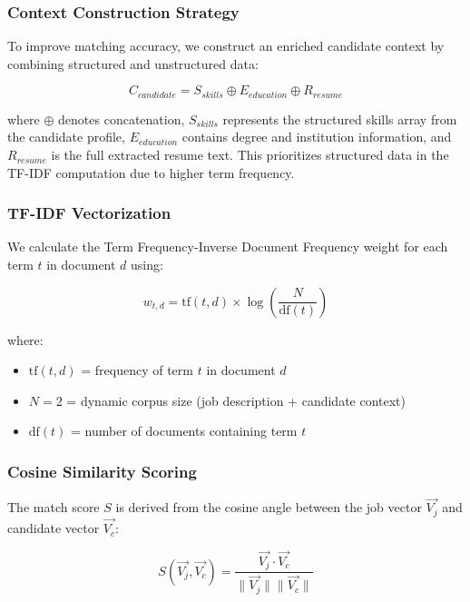 \documentclass[conference]{IEEEtran}
\begin{document}
\subsubsection{Context Construction Strategy}

To improve matching accuracy, we construct an enriched candidate context by combining structured and unstructured data:

\begin{equation}
C_{candidate} = S_{skills} \oplus E_{education} \oplus R_{resume}
\end{equation}

where $\oplus$ denotes concatenation, $S_{skills}$ represents the structured skills array from the candidate profile, $E_{education}$ contains degree and institution information, and $R_{resume}$ is the full extracted resume text. This prioritizes structured data in the TF-IDF computation due to higher term frequency.

\subsubsection{TF-IDF Vectorization}

We calculate the Term Frequency-Inverse Document Frequency weight for each term $t$ in document $d$ using:

\begin{equation}
w_{t,d} = \text{tf}(t, d) \times \log\left(\frac{N}{\text{df}(t)}\right)
\end{equation}

where:
\begin{itemize}
    \item $\text{tf}(t, d)$ = frequency of term $t$ in document $d$
    \item $N = 2$ = dynamic corpus size (job description + candidate context)
    \item $\text{df}(t)$ = number of documents containing term $t$
\end{itemize}

\subsubsection{Cosine Similarity Scoring}

The match score $S$ is derived from the cosine angle between the job vector $\vec{V_j}$ and candidate vector $\vec{V_c}$:

\begin{equation}
S(\vec{V_j}, \vec{V_c}) = \frac{\vec{V_j} \cdot \vec{V_c}}{\|\vec{V_j}\| \|\vec{V_c}\|}
\end{equation}
\end{document}
